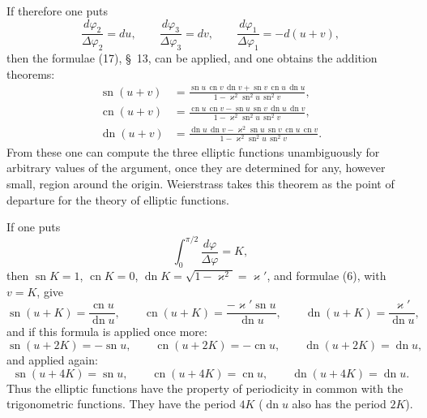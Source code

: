 \documentclass[11pt]{article}
\begin{document}
If therefore one puts
\[
\frac{d\varphi_2}{\Delta\varphi_2}=du,\qquad
\frac{d\varphi_3}{\Delta\varphi_3}=dv,\qquad
\frac{d\varphi_1}{\Delta\varphi_1}=-d(u+v),
\]
then the formulae (17), \S~13, can be applied, and one obtains the addition theorems:
\begin{equation}
\begin{aligned}
\operatorname{sn}(u+v)&=
\frac{\operatorname{sn}u\,\operatorname{cn}v\,\operatorname{dn}v+
\operatorname{sn}v\,\operatorname{cn}u\,\operatorname{dn}u}
{1-\varkappa^2\operatorname{sn}^2u\,\operatorname{sn}^2v},\\
\operatorname{cn}(u+v)&=
\frac{\operatorname{cn}u\,\operatorname{cn}v-
\operatorname{sn}u\,\operatorname{sn}v\,\operatorname{dn}u\,\operatorname{dn}v}
{1-\varkappa^2\operatorname{sn}^2u\,\operatorname{sn}^2v},\\
\operatorname{dn}(u+v)&=
\frac{\operatorname{dn}u\,\operatorname{dn}v-
\varkappa^2\operatorname{sn}u\,\operatorname{sn}v\,\operatorname{cn}u\,\operatorname{cn}v}
{1-\varkappa^2\operatorname{sn}^2u\,\operatorname{sn}^2v}.
\end{aligned}
\tag{6}
\end{equation}
From these one can compute the three elliptic functions unambiguously for arbitrary values of the argument, once they are determined for any, however small, region around the origin. Weierstrass takes this theorem as the point of departure for the theory of elliptic functions.

If one puts
\[
\int_0^{\pi/2}\frac{d\varphi}{\Delta\varphi}=K,
\]
then $\operatorname{sn}K=1$, $\operatorname{cn}K=0$, $\operatorname{dn}K=\sqrt{1-\varkappa^2}=\varkappa'$, and formulae (6), with $v=K$, give
\begin{equation}
\operatorname{sn}(u+K)=\frac{\operatorname{cn}u}{\operatorname{dn}u},\qquad
\operatorname{cn}(u+K)=\frac{-\varkappa'\operatorname{sn}u}{\operatorname{dn}u},\qquad
\operatorname{dn}(u+K)=\frac{\varkappa'}{\operatorname{dn}u},
\tag{7}
\end{equation}
and if this formula is applied once more:
\begin{equation}
\operatorname{sn}(u+2K)=-\operatorname{sn}u,\qquad
\operatorname{cn}(u+2K)=-\operatorname{cn}u,\qquad
\operatorname{dn}(u+2K)=\operatorname{dn}u,
\tag{8}
\end{equation}
and applied again:
\begin{equation}
\operatorname{sn}(u+4K)=\operatorname{sn}u,\qquad
\operatorname{cn}(u+4K)=\operatorname{cn}u,\qquad
\operatorname{dn}(u+4K)=\operatorname{dn}u.
\tag{9}
\end{equation}
Thus the elliptic functions have the property of periodicity in common with the trigonometric functions. They have the period $4K$ ($\operatorname{dn}u$ also has the period $2K$).
\end{document}

